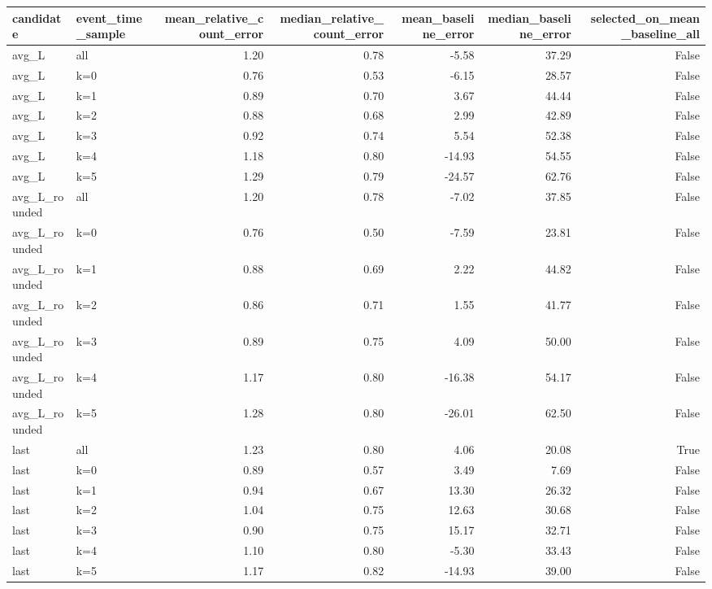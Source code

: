 \begin{tabular}{llrrrrr}
\toprule
candidate & event_time_sample & mean_relative_count_error & median_relative_count_error & mean_baseline_error & median_baseline_error & selected_on_mean_baseline_all \\
\midrule
avg_L & all & 1.20 & 0.78 & -5.58 & 37.29 & False \\
avg_L & k=0 & 0.76 & 0.53 & -6.15 & 28.57 & False \\
avg_L & k=1 & 0.89 & 0.70 & 3.67 & 44.44 & False \\
avg_L & k=2 & 0.88 & 0.68 & 2.99 & 42.89 & False \\
avg_L & k=3 & 0.92 & 0.74 & 5.54 & 52.38 & False \\
avg_L & k=4 & 1.18 & 0.80 & -14.93 & 54.55 & False \\
avg_L & k=5 & 1.29 & 0.79 & -24.57 & 62.76 & False \\
avg_L_rounded & all & 1.20 & 0.78 & -7.02 & 37.85 & False \\
avg_L_rounded & k=0 & 0.76 & 0.50 & -7.59 & 23.81 & False \\
avg_L_rounded & k=1 & 0.88 & 0.69 & 2.22 & 44.82 & False \\
avg_L_rounded & k=2 & 0.86 & 0.71 & 1.55 & 41.77 & False \\
avg_L_rounded & k=3 & 0.89 & 0.75 & 4.09 & 50.00 & False \\
avg_L_rounded & k=4 & 1.17 & 0.80 & -16.38 & 54.17 & False \\
avg_L_rounded & k=5 & 1.28 & 0.80 & -26.01 & 62.50 & False \\
last & all & 1.23 & 0.80 & 4.06 & 20.08 & True \\
last & k=0 & 0.89 & 0.57 & 3.49 & 7.69 & False \\
last & k=1 & 0.94 & 0.67 & 13.30 & 26.32 & False \\
last & k=2 & 1.04 & 0.75 & 12.63 & 30.68 & False \\
last & k=3 & 0.90 & 0.75 & 15.17 & 32.71 & False \\
last & k=4 & 1.10 & 0.80 & -5.30 & 33.43 & False \\
last & k=5 & 1.17 & 0.82 & -14.93 & 39.00 & False \\
\bottomrule
\end{tabular}
